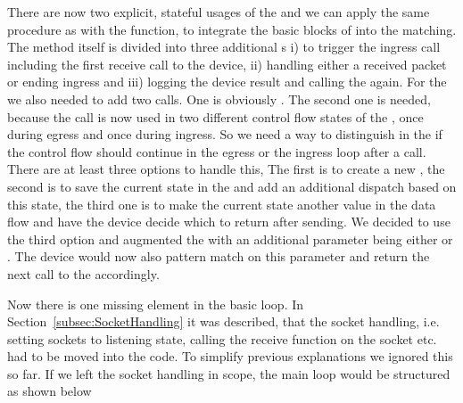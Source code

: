 There are now two explicit, stateful usages of the \dev{} and we can apply the same procedure as with the  function, to integrate the basic blocks of  into the  matching. The method itself is divided into three additional s i)  to trigger the ingress call including the first receive call to the device, ii)  handling either a received packet or ending ingress and iii)  logging the device result and calling the  again. For the \dev{} we also needed to add two calls. One is obviously . The second one is needed, because the call   is now used in two different control flow states of the \stack{}, once during egress and once during ingress. So we need a way to distinguish in the \stack{} if the control flow should continue in the egress or the ingress loop after a  call. There are at least three options to handle this, The first is to create a new , the second is to save the current state in the \stack and add an additional dispatch based on this state, the third one is to make the current state another value in the data flow and have the device decide which  to return after sending. We decided to use the third option and augmented the  with an additional parameter  being either  or . The device would now also pattern match on this parameter and return the next call to the \stack{} accordingly.

Now there is one missing element in the basic loop. In Section~\ref{subsec:SocketHandling} it was described, that the socket handling, i.e. setting sockets to listening state, calling the receive function on the socket etc. had to be moved into the \stack{} code. To simplify previous explanations we ignored this so far. If we left the socket handling in scope, the main loop would be structured as shown below

